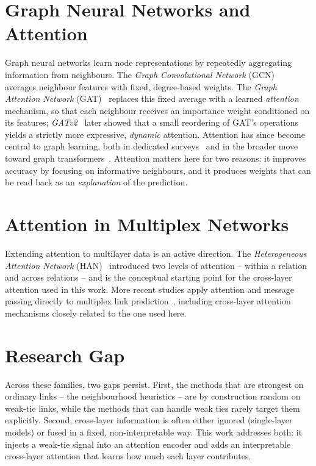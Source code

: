 \section{Graph Neural Networks and Attention}
Graph neural networks learn node representations by repeatedly aggregating information from
neighbours. The \emph{Graph Convolutional Network} (GCN)~\cite{gcn} averages neighbour features with
fixed, degree-based weights. The \emph{Graph Attention Network} (GAT)~\cite{gat} replaces this fixed
average with a learned \emph{attention} mechanism, so that each neighbour receives an importance
weight conditioned on its features; \emph{GATv2}~\cite{gatv2} later showed that a small
reordering of GAT's operations yields a strictly more expressive, \emph{dynamic} attention.
Attention has since become central to graph learning, both in dedicated
surveys~\cite{attnsurvey2023} and in the broader move toward graph
transformers~\cite{gtsurvey2024}. Attention matters here for two reasons: it improves
accuracy by focusing on informative neighbours, and it produces weights that can be read back as an
\emph{explanation} of the prediction.

\section{Attention in Multiplex Networks}
Extending attention to multilayer data is an active direction. The \emph{Heterogeneous Attention
Network} (HAN)~\cite{han2019} introduced two levels of attention -- within a relation and across
relations -- and is the conceptual starting point for the cross-layer attention used in this work.
More recent studies apply attention and message passing directly to multiplex link
prediction~\cite{multiplexsage2024,gao2023}, including cross-layer attention mechanisms closely
related to the one used here.

\section{Research Gap}
Across these families, two gaps persist. First, the methods that are strongest on ordinary links --
the neighbourhood heuristics -- are by construction random on weak-tie links, while the methods that
can handle weak ties rarely target them explicitly. Second, cross-layer information is often either
ignored (single-layer models) or fused in a fixed, non-interpretable way. This work addresses both:
it injects a weak-tie signal into an attention encoder and adds an interpretable cross-layer
attention that learns how much each layer contributes.
